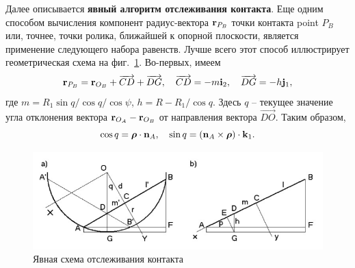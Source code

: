 Далее описывается \textbf{явный алгоритм отслеживания контакта}. Еще одним способом вычисления компонент радиус-вектора ${\bf r}_{P_B}$ точки контакта point $P_B$ или, точнее, точки ролика, ближайшей к опорной плоскости, является применение следующего набора равенств.
Лучше всего этот способ иллюстрирует геометрическая схема на фиг.~\ref{fig:figure3}. Во-первых, имеем
$$
{\bf r}_{P_B}={\bf r}_{O_B}+\overrightarrow{CD}+\overrightarrow{DG},\quad
\overrightarrow{CD}=-m{\bf i}_2,\quad\overrightarrow{DG}=-h{\bf j}_1,
$$
где $m=R_1\sin q/\cos q/\cos\psi $, $h=R-R_1/\cos q$. Здесь $q$ -- текущее значение угла отклонения вектора ${\bf r}_{O_A}-{\bf r}_{O_B}$ от 
направления вектора $\overrightarrow{DO}$. Таким образом,
$$
\cos q=\boldsymbol{\mathbf{\rho}}\cdot{\bf n}_A,\quad\sin q=
\left({\bf n}_A\times\boldsymbol{\mathbf{\rho}}\right)\cdot {\bf k}_1.
$$
\begin{figure}[ht]
\centerline{\includegraphics[scale=0.7]{content/parts/3_friction/mo2015/stepanov.png}}
\caption{Явная схема отслеживания контакта}
\label{fig:figure3}
\end{figure}

%

